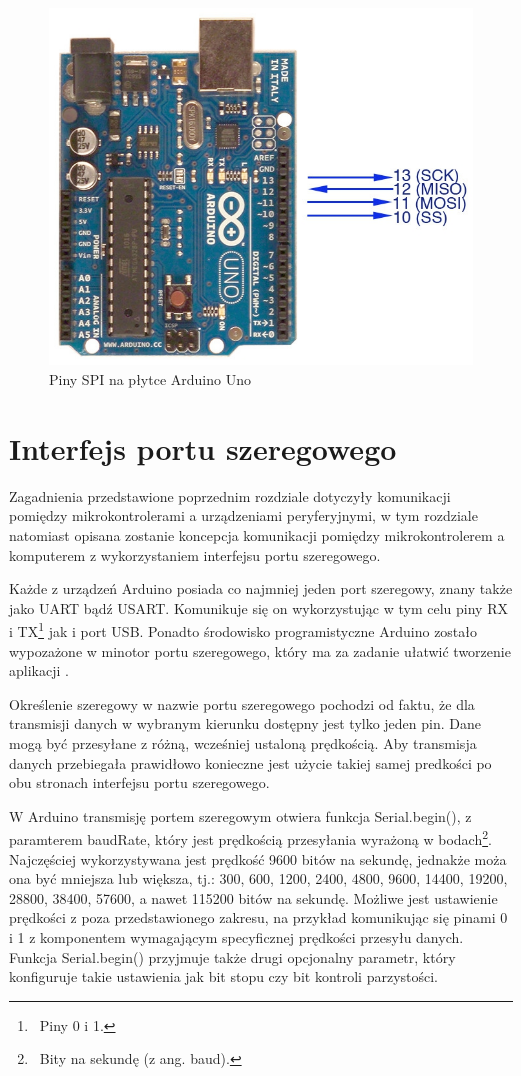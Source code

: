 \documentclass[12pt]{report}
\begin{document}
\begin{figure}[h]
\centering
\includegraphics[width=.55\textwidth]{../resources/spi.jpg}
\caption{Piny SPI na płytce Arduino Uno}
\end{figure}

\section{Interfejs portu szeregowego}

Zagadnienia przedstawione poprzednim rozdziale dotyczyły komunikacji pomiędzy mikrokontrolerami a urządzeniami peryferyjnymi, w tym rozdziale natomiast opisana zostanie koncepcja komunikacji pomiędzy mikrokontrolerem a komputerem z wykorzystaniem interfejsu portu szeregowego.

Każde z urządzeń Arduino posiada co najmniej jeden port szeregowy, znany także jako UART bądź USART. Komunikuje się on wykorzystując w tym celu piny RX i TX\footnote{~Piny 0 i 1.} jak i port USB. Ponadto środowisko programistyczne Arduino zostało wypozażone w minotor portu szeregowego, który ma za zadanie ułatwić tworzenie aplikacji \cite{arduinostr}.

Określenie szeregowy w nazwie portu szeregowego pochodzi od faktu, że dla transmisji danych w wybranym kierunku dostępny jest tylko jeden pin. Dane mogą być przesyłane z różną, wcześniej ustaloną prędkością. Aby transmisja danych przebiegała prawidłowo konieczne jest użycie takiej samej predkości po obu stronach interfejsu portu szeregowego.

W Arduino transmisję portem szeregowym otwiera funkcja Serial.begin(), z paramterem baudRate, który jest prędkością przesyłania wyrażoną w bodach\footnote{~Bity na sekundę (z ang. baud).}. Naj\-częściej wykorzystywana jest prędkość 9600 bitów na sekundę, jednakże moża ona być mniejsza lub większa, tj.: 300, 600, 1200, 2400, 4800, 9600, 14400, 19200, 28800, 38400, 57600, a nawet 115200 bitów na sekundę. Możliwe jest ustawienie prędkości z poza przedstawionego zakresu, na przykład komunikując się pinami 0 i 1 z komponentem wymagającym specyficznej prędkości przesyłu danych. Funkcja Serial.be\-gin() przyjmuje także drugi opcjonalny parametr, który konfiguruje takie ustawienia jak bit stopu czy bit kontroli parzystości.
\end{document}
